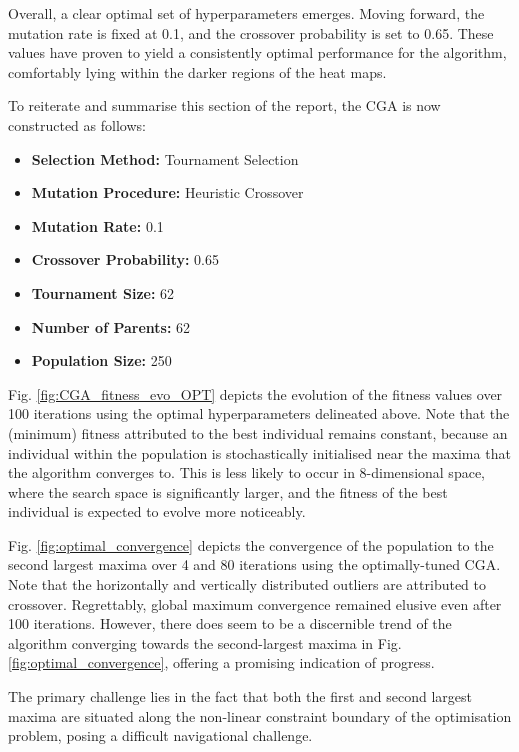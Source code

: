\documentclass[10pt]{article}
\begin{document}
\begin{multicols}{2}
Overall, a clear optimal set of hyperparameters emerges. Moving forward, the mutation rate is fixed at 0.1, and the crossover probability is set to 0.65. These values have proven to yield a consistently optimal performance for the algorithm, comfortably lying within the darker regions of the heat maps.

To reiterate and summarise this section of the report, the CGA is now constructed as follows:

\begin{itemize}
    \item \textbf{Selection Method:} Tournament Selection
    \item \textbf{Mutation Procedure:} Heuristic Crossover
    \item \textbf{Mutation Rate:} 0.1
    \item \textbf{Crossover Probability:} 0.65
    \item \textbf{Tournament Size:} 62
    \item \textbf{Number of Parents:} 62
    \item \textbf{Population Size:} 250
\end{itemize}

Fig. \ref{fig:CGA_fitness_evo_OPT} depicts the evolution of the fitness values over 100 iterations using the optimal hyperparameters delineated above. Note that the (minimum) fitness attributed to the best individual remains constant, because an individual within the population is stochastically initialised near the maxima that the algorithm converges to. This is less likely to occur in 8-dimensional space, where the search space is significantly larger, and the fitness of the best individual is expected to evolve more noticeably.

Fig. \ref{fig:optimal_convergence} depicts the convergence of the population to the second largest maxima over 4 and 80 iterations using the optimally-tuned CGA. Note that the horizontally and vertically distributed outliers are attributed to crossover. Regrettably, global maximum convergence remained elusive even after 100 iterations. However, there does seem to be a discernible trend of the algorithm converging towards the second-largest maxima in Fig. \ref{fig:optimal_convergence}, offering a promising indication of progress. 

The primary challenge lies in the fact that both the first and second largest maxima are situated along the non-linear constraint boundary of the optimisation problem, posing a difficult navigational challenge.


\end{multicols}
\end{document}
